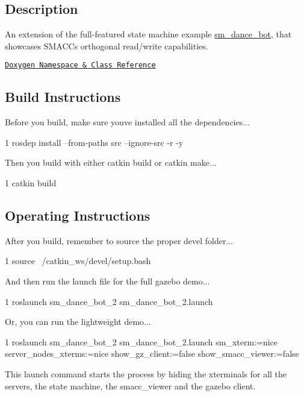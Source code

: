 

\subsection*{Description}

An extension of the full-\/featured state machine example \hyperlink{namespacesm__dance__bot}{sm\+\_\+dance\+\_\+bot}, that showcases S\+M\+A\+CC\textquotesingle{}s orthogonal read/write capabilities.~\newline


\href{https://reelrbtx.github.io/SMACC_Documentation/master/html/namespacesm__dance__bot__2.html}{\tt Doxygen Namespace \& Class Reference}

\subsection*{Build Instructions}

Before you build, make sure you\textquotesingle{}ve installed all the dependencies...


\begin{DoxyCode}
1 rosdep install --from-paths src --ignore-src -r -y 
\end{DoxyCode}


Then you build with either catkin build or catkin make...


\begin{DoxyCode}
1 catkin build
\end{DoxyCode}
 \subsection*{Operating Instructions}

After you build, remember to source the proper devel folder...


\begin{DoxyCode}
1 source ~/catkin\_ws/devel/setup.bash
\end{DoxyCode}


And then run the launch file for the full gazebo demo...


\begin{DoxyCode}
1 roslaunch sm\_dance\_bot\_2 sm\_dance\_bot\_2.launch
\end{DoxyCode}


Or, you can run the lightweight demo...


\begin{DoxyCode}
1 roslaunch sm\_dance\_bot\_2 sm\_dance\_bot\_2.launch sm\_xterm:=nice server\_nodes\_xterms:=nice
       show\_gz\_client:=false show\_smacc\_viewer:=false
\end{DoxyCode}


This launch command starts the process by hiding the xterminals for all the servers, the state machine, the smacc\+\_\+viewer and the gazebo client. 